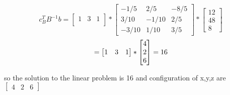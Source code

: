 \[
c_B^TB^{-1}b=
\begin{bmatrix}
1&3&1\\
\end{bmatrix}
*
\begin{bmatrix}
-1/5  &2/5&-8/5\\
3/10 &-1/10&2/5\\
-3/10 &1/10&3/5
\end{bmatrix}
*
\begin{bmatrix}
12\\
48\\
8
\end{bmatrix}
\]
\[=
\begin{bmatrix}
1&3&1\\
\end{bmatrix}
*
\begin{bmatrix}
4\\
2\\
6
\end{bmatrix}
=
16\\
\]

so the solution to the linear problem is 16 and configuration of x,y,z are $\begin{bmatrix}4&	2&	6\end{bmatrix}$


